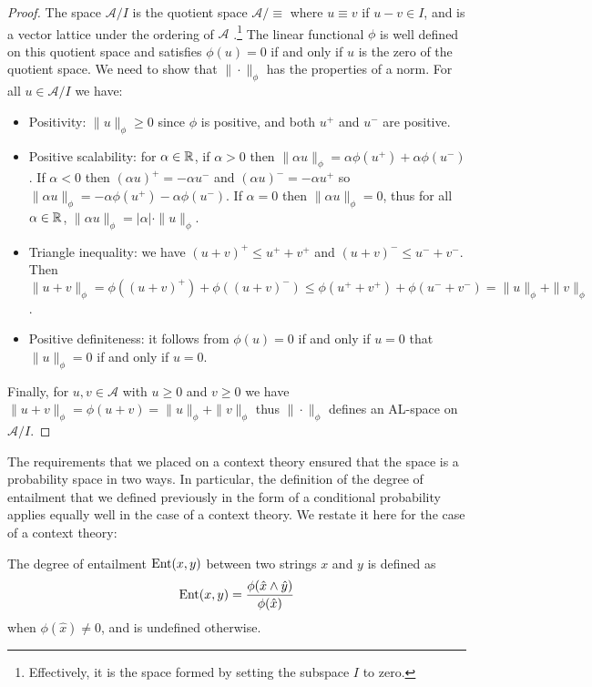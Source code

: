 \begin{proof}
The space $\mathcal{A}/I$ is the quotient space $\mathcal{A}/\equiv$ where $u\equiv v$ if $u - v \in I$, and is a vector lattice under the ordering of $\mathcal{A}$ \citep{Aliprantis:85}.\footnote{Effectively, it is the space formed by setting the subspace $I$ to zero.} The linear functional $\phi$ is well defined on this quotient space and satisfies $\phi(u) = 0$ if and only if $u$ is the zero of the quotient space. We need to show that $\|\cdot\|_\phi$ has the properties of a norm. For all $u \in \mathcal{A}/I$ we have:
\begin{itemize}
\item Positivity: $\|u\|_\phi \ge 0$ since $\phi$ is positive, and both $u^+$ and $u^-$ are positive.
\item Positive scalability: for $\alpha \in \mathbb{R}$, if $\alpha > 0$ then $\|\alpha u\|_\phi = \alpha\phi(u^+) + \alpha\phi(u^-)$. If $\alpha < 0$ then $(\alpha u)^+ = -\alpha u^-$ and $(\alpha u)^- = -\alpha u^+$ so $\|\alpha u\|_\phi = -\alpha\phi(u^+) - \alpha\phi(u^-)$. If $\alpha = 0$ then $\|\alpha u\|_\phi = 0$, thus for all $\alpha \in \mathbb{R}$, $\|\alpha u\|_\phi = |\alpha| \cdot \|u\|_\phi$.
\item Triangle inequality: we have $(u+v)^+ \le u^+ + v^+$ and $(u+v)^- \le u^- + v^-$. Then $\|u+v\|_\phi = \phi((u+v)^+) + \phi((u+v)^-) \le \phi(u^+ + v^+) + \phi(u^- + v^-) = \|u\|_\phi + \|v\|_\phi$.
\item Positive definiteness: it follows from $\phi(u) = 0$ if and only if $u = 0$ that $\|u\|_\phi = 0$ if and only if $u = 0$.
\end{itemize}
Finally, for $u,v \in \mathcal{A}$ with $u \ge 0$ and $v \ge 0$ we have $\|u + v\|_\phi = \phi(u+v) = \|u\|_\phi + \|v\|_\phi$ thus $\|\cdot\|_\phi$ defines an AL-space on $\mathcal{A}/I$.
\end{proof}


The requirements that we placed on a context theory ensured that the space is a probability space in two ways. In particular, the definition of the degree of entailment that we defined previously in the form of a conditional probability applies equally well in the case of a context theory. We restate it here for the case of a context theory:
\begin{defn}
The degree of entailment $\operatorname{Ent}(x,y)$ between two strings $x$ and $y$ is defined as
$$\operatorname{Ent}(x,y) = \frac{\phi(\hat{x}\land\hat{y})}{\phi(\hat{x})}$$
when $\phi(\hat{x}) \neq 0$, and is undefined otherwise.
\end{defn}



